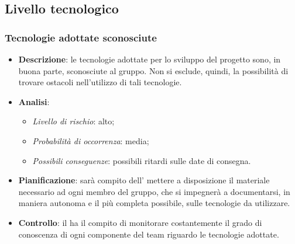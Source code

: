 	\subsection{Livello tecnologico}
		\subsubsection{Tecnologie adottate sconosciute}
			\begin{itemize}
				\item \textbf{Descrizione}: le tecnologie adottate per lo sviluppo del progetto sono, in buona parte, sconosciute al gruppo. Non si esclude, quindi, la possibilità di trovare ostacoli nell'utilizzo di tali tecnologie.
				\item \textbf{Analisi}:
					\begin{itemize}
						\item \textit{Livello di rischio}: alto;
						\item \textit{Probabilità di occorrenza}: media;
						\item \textit{Possibili conseguenze}: possibili ritardi sulle date di consegna.
					\end{itemize}
				\item \textbf{Pianificazione}: sarà compito dell' mettere a disposizione il materiale necessario ad ogni membro del gruppo, che si impegnerà a documentarsi, in maniera autonoma e il più completa possibile, sulle tecnologie da utilizzare.
				\item \textbf{Controllo}: il  ha il compito di monitorare costantemente il grado di conoscenza di ogni componente del team riguardo le tecnologie adottate.
			\end{itemize}
